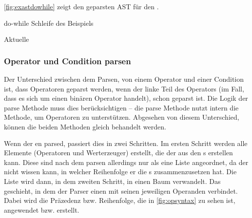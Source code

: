 {{{      \autoref{fig:exastdowhile} zeigt den geparsten AST für den .
      \begin{paracol}{2}
        \begin{myCodeEnv}
          \centering
          \begin{myInvBox}[width=.9\linewidth]
            
          \end{myInvBox}
          \caption{do-while Schleife des Beispiels}
          \label{fig:exastdowhile}
        \end{myCodeEnv}
        \switchcolumn
        \begin{myCodeEnv}
          \centering
          \begin{myInvBox}[width=.9\linewidth]
            
          \end{myInvBox}
          \caption*{Aktuelle }
        \end{myCodeEnv}
      \end{paracol}


    \subsubsection{Operator und Condition parsen}
    \label{sssec:Operator und Condition parsen}
      Der Unterschied zwischen dem Parsen, von einem Operator und einer Condition ist, dass Operatoren geparst werden, wenn der linke Teil des Operators (im Fall, dass es sich um einen binären Operator handelt), schon geparst ist. Die Logik der  parse Methode muss dies berücksichtigen -- die  parse Methode nutzt intern die  Methode, um Operatoren zu unterstützen. Abgesehen von diesem Unterschied, können die beiden Methoden gleich behandelt werden.

      Wenn der  en parsed, passiert dies in zwei Schritten. Im ersten Schritt werden alle  Elemente (Operatoren und Werterzeuger) erstellt, die der  aus den s erstellen kann. Diese sind nach dem parsen allerdings nur als eine Liste angeordnet, da der  nicht wissen kann, in welcher Reihenfolge er die s zusammenzusetzen hat. Die Liste wird dann, in dem zweiten Schritt, in einen Baum verwandelt. Das geschieht, in dem der Parser einen  mit seinen jeweiligen Operanden verbindet. Dabei wird die Präzedenz bzw. Reihenfolge, die in \autoref{fig:opsyntax} zu sehen ist, angewendet bzw. erstellt.

}}}

